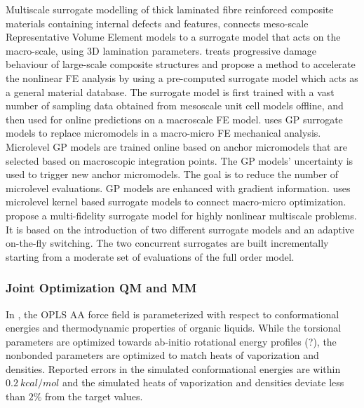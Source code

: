 \documentclass[preprint,12pt]{elsarticle}
\begin{document}
Multiscale surrogate modelling of thick laminated fibre reinforced composite materials containing internal defects and features, \cite{el2018multiscale} connects meso-scale Representative Volume Element models to a surrogate model that acts on the macro-scale, using 3D lamination parameters. 
\cite{yan2020efficient} treats progressive damage behaviour of large-scale composite structures and propose a method to accelerate the nonlinear FE analysis by using a pre-computed surrogate model which acts as a general material database. The surrogate model is first trained with a vast number of sampling data obtained from mesoscale unit cell models offline, and then used for online predictions on a macroscale FE model.
\cite{rocha2020fly} uses GP surrogate models to replace micromodels in a macro-micro FE mechanical analysis. Microlevel GP models are trained online based on anchor micromodels that are selected based on macroscopic integration points. The GP models' uncertainty is used to trigger new anchor micromodels. The goal is to reduce the number of microlevel evaluations. GP models are enhanced with gradient information. 
\cite{wirtz2015surrogate} uses microlevel kernel based surrogate models to connect macro-micro optimization. 
\cite{fritzen2019fly} propose a multi-fidelity surrogate model for highly nonlinear multiscale problems. It is based on the introduction of two different surrogate models and an adaptive on-the-fly switching. The two concurrent surrogates are built incrementally starting from a moderate set of evaluations of the full order model. 


\subsubsection{Joint Optimization QM and MM}

In \cite{Jorgensen2996}, the OPLS AA force field is parameterized with respect to conformational energies and thermodynamic properties of organic liquids. While the torsional parameters are optimized towards ab-initio rotational energy profiles (?), the nonbonded parameters are optimized to match heats of vaporization and densities. Reported errors in the simulated conformational energies are within $0.2\ kcal/mol$ and the simulated heats of vaporization and densities deviate less than $2\%$ from the target values.
\end{document}
